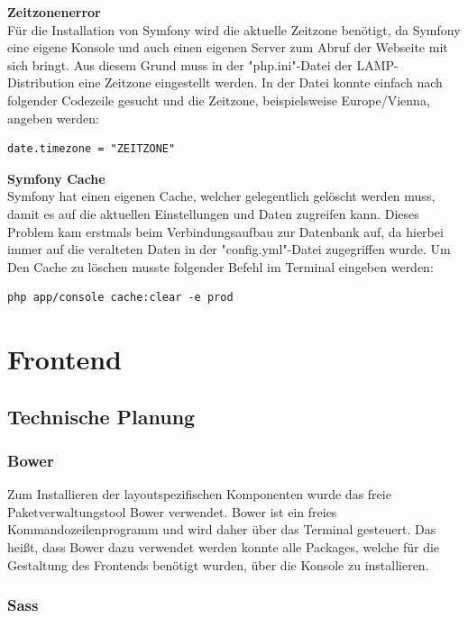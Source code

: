 \textbf{Zeitzonenerror}\\
Für die Installation von Symfony wird die aktuelle Zeitzone benötigt, da Symfony eine eigene Konsole und auch einen eigenen Server zum Abruf der Webseite mit sich bringt.
Aus diesem Grund muss in der "php.ini"-Datei der LAMP-Distribution eine Zeitzone eingestellt werden. In der Datei konnte einfach nach folgender Codezeile gesucht und die Zeitzone, beispielsweise Europe/Vienna, angeben werden:
	\lstset{language=java}
  	\begin{lstlisting}
date.timezone = "ZEITZONE"
  	\end{lstlisting}
\textbf{Symfony Cache}\\
Symfony hat einen eigenen Cache, welcher gelegentlich gelöscht werden muss, damit es auf die aktuellen Einstellungen und Daten zugreifen kann.
Dieses Problem kam erstmals beim Verbindungsaufbau zur Datenbank auf, da hierbei immer auf die veralteten Daten in der "config.yml"-Datei zugegriffen wurde.
Um Den Cache zu löschen musste folgender Befehl im Terminal eingeben werden:
	\lstset{language=bash}
  	\begin{lstlisting}
php app/console cache:clear -e prod
  	\end{lstlisting}
\pagebreak
\section{Frontend}

  \subsection{Technische Planung}

    \subsubsection{Bower}

Zum Installieren der layoutspezifischen Komponenten wurde das freie Paketverwaltungstool {Bower\cite{bower}} verwendet. Bower ist ein freies Kommandozeilenprogramm und wird daher über das Terminal gesteuert. Das heißt, dass Bower dazu verwendet werden konnte alle Packages, welche für die Gestaltung des Frontends benötigt wurden, über die Konsole zu installieren.

    \subsubsection{Sass}


